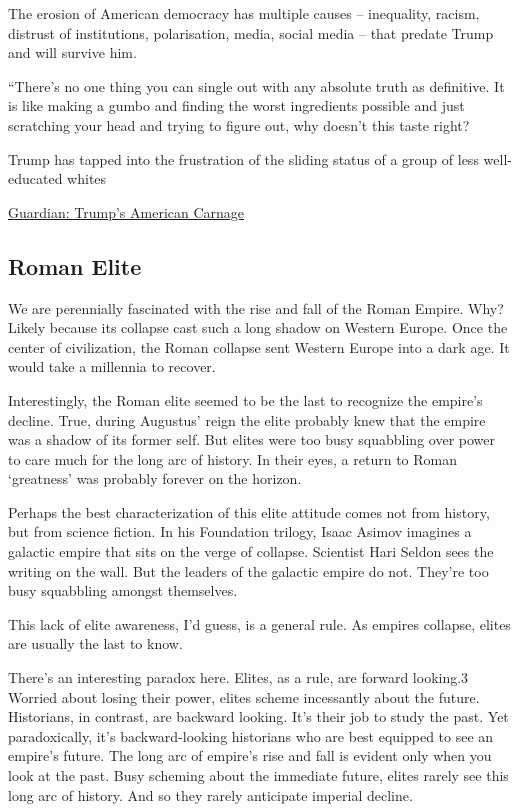 \documentclass[
]{book}
\begin{document}
The erosion of American democracy has multiple causes -- inequality, racism, distrust of institutions, polarisation, media, social media -- that predate Trump and will survive him.

``There's no one thing you can single out with any absolute truth as definitive. It is like making a gumbo and finding the worst ingredients possible and just scratching your head and trying to figure out, why doesn't this taste right?

Trump has tapped into the frustration of the sliding status of a group of less well-educated whites

\href{https://www.theguardian.com/us-news/2021/jan/10/trump-american-carnage-inequality-racism-polarisation'}{Guardian: Trump's American Carnage}

\hypertarget{roman-elite}{%
\subsection{Roman Elite}\label{roman-elite}}

We are perennially fascinated with the rise and fall of the Roman Empire. Why? Likely because its collapse cast such a long shadow on Western Europe. Once the center of civilization, the Roman collapse sent Western Europe into a dark age. It would take a millennia to recover.

Interestingly, the Roman elite seemed to be the last to recognize the empire's decline. True, during Augustus' reign the elite probably knew that the empire was a shadow of its former self. But elites were too busy squabbling over power to care much for the long arc of history. In their eyes, a return to Roman `greatness' was probably forever on the horizon.

Perhaps the best characterization of this elite attitude comes not from history, but from science fiction. In his Foundation trilogy, Isaac Asimov imagines a galactic empire that sits on the verge of collapse. Scientist Hari Seldon sees the writing on the wall. But the leaders of the galactic empire do not. They're too busy squabbling amongst themselves.

This lack of elite awareness, I'd guess, is a general rule. As empires collapse, elites are usually the last to know.

There's an interesting paradox here. Elites, as a rule, are forward looking.3 Worried about losing their power, elites scheme incessantly about the future. Historians, in contrast, are backward looking. It's their job to study the past. Yet paradoxically, it's backward-looking historians who are best equipped to see an empire's future. The long arc of empire's rise and fall is evident only when you look at the past. Busy scheming about the immediate future, elites rarely see this long arc of history. And so they rarely anticipate imperial decline.
\end{document}
